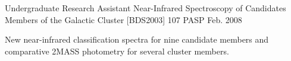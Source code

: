 \begin{cventries}
  \cventry
    {Undergraduate Research Assistant} %
    {Near-Infrared Spectroscopy of Candidates Members of the Galactic Cluster [BDS2003] 107} %
    {PASP} %
    {Feb. 2008} %
    {
      \begin{cvitems} %
        \item {New near-infrared classification spectra for nine candidate members and comparative 2MASS photometry for several cluster members.}
      \end{cvitems}
    }

\end{cventries}
